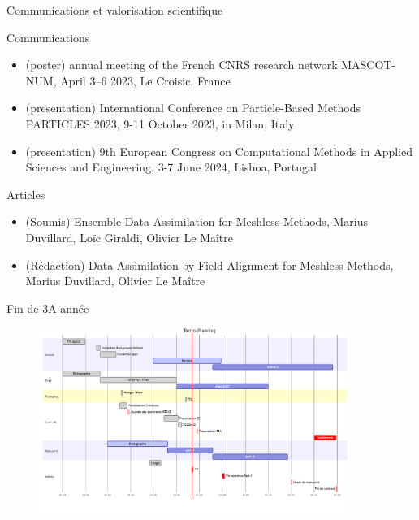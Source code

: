 \documentclass[aspectratio=169]{beamer} %
\begin{document}
\begin{frame}{Communications et valorisation scientifique}
    \begin{block}{Communications}
        \begin{itemize}
            \item (poster) annual meeting of the French CNRS research network MASCOT-NUM, April 3–6 2023, Le Croisic, France
            \item (presentation) International Conference on Particle-Based Methods PARTICLES 2023, 9-11 October 2023, in Milan, Italy
            \item (presentation) 9th European Congress on Computational Methods in Applied Sciences and Engineering, 3-7 June 2024, Lisboa, Portugal
        \end{itemize}
    \end{block}

    \begin{block}{Articles}
        \begin{itemize}
            \item (Soumis) Ensemble Data Assimilation for Meshless Methods, Marius Duvillard, Loïc Giraldi, Olivier Le Maître
            \item (Rédaction) Data Assimilation by Field Alignment for Meshless Methods, Marius Duvillard, Olivier Le Maître
        \end{itemize}
    \end{block}

\end{frame}

\begin{frame}{Fin de 3A année}
    \begin{figure}
        \includegraphics[width=0.9\textwidth]{image/retro_planning.png}
    \end{figure}
\end{frame}
\end{document}
